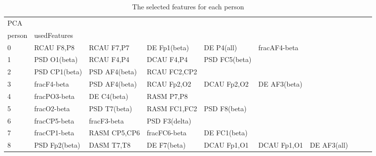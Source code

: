\begin{landscape}
\begin{table}[]
\centering
\caption{The selected features for each person}
\begin{tabular}{l|llllllll}
PCA      &                &                &                &                &                &                &                &                &               &              \\
person   & usedFeatures   &                &                &                &                &                &                &                &               &              \\
0        & RCAU F8,P8     & RCAU F7,P7     & DE Fp1(beta)   & DE P4(all)     & fracAF4-beta   &                &                &                &               &              \\
1        & PSD O1(beta)   & RCAU F4,P4     & DCAU F4,P4     & PSD FC5(beta)  &                &                &                &                &               &              \\
2        & PSD CP1(beta)  & PSD AF4(beta)  & RCAU FC2,CP2   &                &                &                &                &                &               &              \\
3        & fracF4-beta    & PSD AF4(beta)  & RCAU Fp2,O2    & DCAU Fp2,O2    & DE AF3(beta)   &                &                &                &               &              \\
4        & fracPO3-beta   & DE C4(beta)    & RASM P7,P8     &                &                &                &                &                &               &              \\
5        & fracO2-beta    & PSD T7(beta)   & RASM FC1,FC2   & PSD F8(beta)   &                &                &                &                &               &              \\
6        & fracCP5-beta   & fracF3-beta    & PSD F3(delta)  &                &                &                &                &                &               &              \\
7        & fracCP1-beta   & RASM CP5,CP6   & fracFC6-beta   & DE FC1(beta)   &                &                &                &                &               &              \\
8        & PSD Fp2(beta)  & DASM T7,T8     & DE F7(beta)    & DCAU Fp1,O1    & DCAU Fp1,O1    & DE AF3(all)    &                &                &               &              \\

\end{tabular}
\end{table}
\end{landscape}
